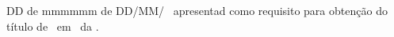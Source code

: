 \begin{ApprovalPage}%
{DD de mmmmmm de \YearNum}%
{DD/MM/\YearNum}%
{\linewidth}%
\DocumentTypeName\ apresentad como requisito para obtenção do título de \StudentsTitlesList\ em \CourseName\ da .
\end{ApprovalPage}

% 

% 

% 

